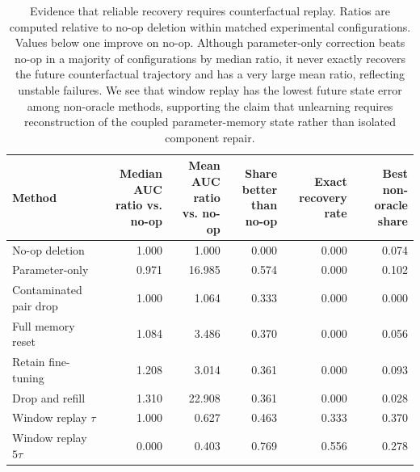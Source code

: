 \documentclass{ssl}
\begin{document}
\begin{landscape}
\begin{table}[t]
\centering
\caption{
Evidence that reliable recovery requires counterfactual replay. 
Ratios are computed relative to no-op deletion within matched experimental configurations. 
Values below one improve on no-op. 
Although parameter-only correction beats no-op in a majority of configurations by median ratio, it never exactly recovers the future counterfactual trajectory and has a very large mean ratio, reflecting unstable failures. 
We see that window replay has the lowest future state error among non-oracle methods, supporting the claim that unlearning requires reconstruction of the coupled parameter-memory state rather than isolated component repair.
}
\label{tab:counterfactual-replay-evidence}
\small
\begin{tabularx}{\textwidth}{lrrrrr}
\toprule
Method 
& \makecell{Median AUC\\ratio vs. no-op}
& \makecell{Mean AUC\\ratio vs. no-op}
& \makecell{Share better\\than no-op}
& \makecell{Exact recovery\\rate}
& \makecell{Best non-oracle\\share} \\
\midrule
No-op deletion 
& 1.000 & 1.000 & 0.000 & 0.000 & 0.074 \\
Parameter-only 
& 0.971 & 16.985 & 0.574 & 0.000 & 0.102 \\
Contaminated pair drop 
& 1.000 & 1.064 & 0.333 & 0.000 & 0.000 \\
Full memory reset 
& 1.084 & 3.486 & 0.370 & 0.000 & 0.056 \\
Retain fine-tuning 
& 1.208 & 3.014 & 0.361 & 0.000 & 0.093 \\
Drop and refill 
& 1.310 & 22.908 & 0.361 & 0.000 & 0.028 \\
Window replay $\tau$ 
& 1.000 & 0.627 & 0.463 & 0.333 & 0.370 \\
Window replay $5\tau$ 
& 0.000 & 0.403 & 0.769 & 0.556 & 0.278 \\
\bottomrule
\end{tabularx}
\end{table}
\end{landscape}
\end{document}
